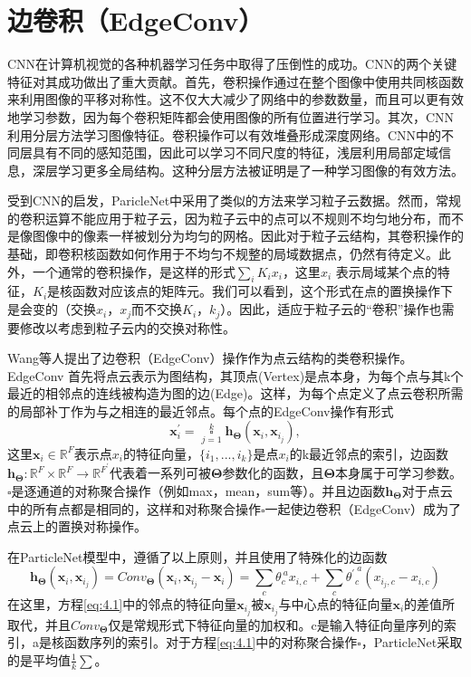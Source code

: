 \section{边卷积（EdgeConv）}
CNN在计算机视觉的各种机器学习任务中取得了压倒性的成功。CNN的两个关键特征对其成功做出了重大贡献。首先，卷积操作通过在整个图像中使用共同核函数来利用图像的平移对称性。这不仅大大减少了网络中的参数数量，而且可以更有效地学习参数，因为每个卷积矩阵都会使用图像的所有位置进行学习。其次，CNN利用分层方法学习图像特征。卷积操作可以有效堆叠形成深度网络。CNN中的不同层具有不同的感知范围，因此可以学习不同尺度的特征，浅层利用局部定域信息，深层学习更多全局结构。这种分层方法被证明是了一种学习图像的有效方法。

受到CNN的启发，ParicleNet中采用了类似的方法来学习粒子云数据。然而，常规的卷积运算不能应用于粒子云，因为粒子云中的点可以不规则不均匀地分布，而不是像图像中的像素一样被划分为均匀的网格。因此对于粒子云结构，其卷积操作的基础，即卷积核函数如何作用于不均匀不规整的局域数据点，仍然有待定义。此外，一个通常的卷积操作，是这样的形式$\sum_{i}K_{i}x_{i}$，这里$x_i$
表示局域某个点的特征，$K_i$是核函数对应该点的矩阵元。我们可以看到，这个形式在点的置换操作下是会变的（交换$x_i$，$x_j$而不交换$K_i$，$k_j$）。因此，适应于粒子云的“卷积”操作也需要修改以考虑到粒子云内的交换对称性。

Wang等人提出了边卷积（EdgeConv）操作作为点云结构的类卷积操作。EdgeConv 首先将点云表示为图结构，其顶点(Vertex)是点本身，为每个点与其k个最近的相邻点的连线被构造为图的边(Edge)。这样，为每个点定义了点云卷积所需的局部补丁作为与之相连的最近邻点。每个点的EdgeConv操作有形式
\begin{equation}\label{eq:4.1}
    \bm{x}_{i}^{\prime}=\mathop{\square}\limits_{j=1}^{k}\bm{h}_{\bm{\Theta}}(\bm{x}_{i},\bm{x}_{i_{j}}),
\end{equation}
这里$\bm{x}_{i}\in\mathbb{R}^{F}$表示点$x_i$的特征向量，$\{i_{1},...,i_{k}\}$是点$x_i$的k最近邻点的索引，边函数$\bm{h}_{\bm{\Theta}}:\mathbb{R}^{F}\times\mathbb{R}^{F}\rightarrow\mathbb{R}^{F^{\prime}}$代表着一系列可被$\bm{\Theta}$参数化的函数，且$\bm{\Theta}$本身属于可学习参数。$\square$是逐通道的对称聚合操作（例如max，mean，sum等）。并且边函数$\bm{h_\Theta}$对于点云中的所有点都是相同的，这样和对称聚合操作$\square$一起使边卷积（EdgeConv）成为了点云上的置换对称操作。

在ParticleNet模型中，遵循了以上原则，并且使用了特殊化的边函数
\begin{equation}
    \displaystyle\bm{h}_{\bm{\Theta}}(\bm{x}_{i},\bm{x}_{i_{j}})=\displaystyle{Conv}_{\bm{\Theta}}(\bm{x}_{i},\bm{x}_{i_{j}}-\bm{x}_{i})=\displaystyle\sum_{c}\theta_{c}^{~{}a}x_{i,c}+\sum_{c}{\theta^{\prime}}_{c}^{~{}a}(x_{i_{j},c}-x_{i,c})
\end{equation}
在这里，方程\eqref{eq:4.1}中的邻点的特征向量$\bm{x}_{i_{j}}$被$\bm{x}_{i_{j}}$与中心点的特征向量$\bm{x}_{i}$的差值所取代，并且$Conv_{\bm{\Theta}}$仅是常规形式下特征向量的加权和。c是输入特征向量序列的索引，a是核函数序列的索引。对于方程\eqref{eq:4.1}中的对称聚合操作$\square$，ParticleNet采取的是平均值$\frac{1}{k}\sum$。

